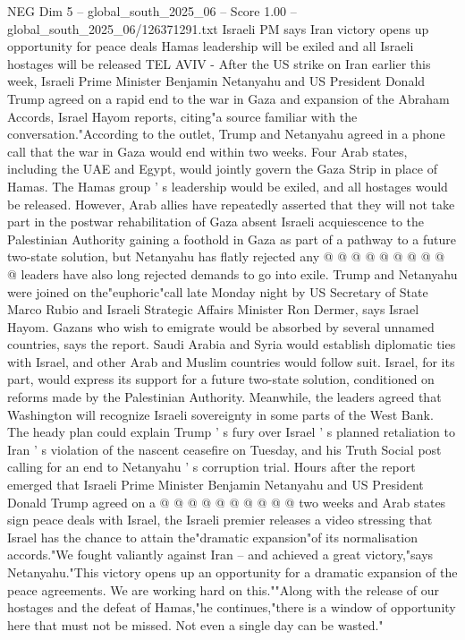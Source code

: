 \begin{textsample}{NEG Dim 5 – global\_south\_2025\_06 – Score 1.00 – global\_south\_2025\_06/126371291.txt}  \label{ex:f5_neg_411}
Israeli PM says Iran victory opens up opportunity for peace deals Hamas leadership will be exiled and all Israeli hostages will be released TEL AVIV - After the US strike on Iran earlier this week, Israeli Prime Minister Benjamin Netanyahu and US President Donald Trump agreed on a rapid end to the war in Gaza and expansion of the Abraham Accords, Israel Hayom reports, citing"a source familiar with the conversation."According to the outlet, Trump and Netanyahu agreed in a phone call that the war in Gaza would end within two weeks.
Four Arab states, including the UAE and Egypt, would jointly govern the Gaza Strip in place of Hamas.
The Hamas group ' s leadership would be exiled, and all hostages would be released.
However, Arab allies have repeatedly asserted that they will not take part in the postwar rehabilitation of Gaza absent Israeli acquiescence to the Palestinian Authority gaining a foothold in Gaza as part of a pathway to a future two-state solution, but Netanyahu has flatly rejected any @ @ @ @ @ @ @ @ @ @ leaders have also long rejected demands to go into exile.
Trump and Netanyahu were joined on the"euphoric"call late Monday night by US Secretary of State Marco Rubio and Israeli Strategic Affairs Minister Ron Dermer, says Israel Hayom.
Gazans who wish to emigrate would be absorbed by several unnamed countries, says the report.
Saudi Arabia and Syria would establish diplomatic ties with Israel, and other Arab and Muslim countries would follow suit.
Israel, for its part, would express its support for a future two-state solution, conditioned on reforms made by the Palestinian Authority.
Meanwhile, the leaders agreed that Washington will recognize Israeli sovereignty in some parts of the West Bank.
The heady plan could explain Trump ' s fury over Israel ' s planned retaliation to Iran ' s violation of the nascent ceasefire on Tuesday, and his Truth Social post calling for an end to Netanyahu ' s corruption trial.
Hours after the report emerged that Israeli Prime Minister Benjamin Netanyahu and US President Donald Trump agreed on a @ @ @ @ @ @ @ @ @ @ two weeks and Arab states sign peace deals with Israel, the Israeli premier releases a video stressing that Israel has the chance to attain the"dramatic expansion"of its normalisation accords."We fought valiantly against Iran -- and achieved a great victory,"says Netanyahu."This victory opens up an opportunity for a dramatic expansion of the peace agreements.
We are working hard on this.""Along with the release of our hostages and the defeat of Hamas,"he continues,"there is a window of opportunity here that must not be missed.
Not even a single day can be wasted."

\end{textsample}
